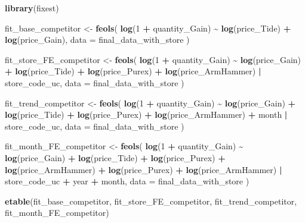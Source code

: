 \documentclass[
]{article}
\newenvironment{Shaded}{\begin{snugshade}}{\end{snugshade}}
\newcommand{\AttributeTok}[1]{\textcolor[rgb]{0.13,0.29,0.53}{#1}}
\newcommand{\DecValTok}[1]{\textcolor[rgb]{0.00,0.00,0.81}{#1}}
\newcommand{\FunctionTok}[1]{\textcolor[rgb]{0.13,0.29,0.53}{\textbf{#1}}}
\newcommand{\NormalTok}[1]{#1}
\newcommand{\OtherTok}[1]{\textcolor[rgb]{0.56,0.35,0.01}{#1}}
\newcommand{\SpecialCharTok}[1]{\textcolor[rgb]{0.81,0.36,0.00}{\textbf{#1}}}
\begin{document}
\begin{Shaded}
\begin{Highlighting}[]
\FunctionTok{library}\NormalTok{(fixest)}

\NormalTok{fit\_base\_competitor }\OtherTok{\textless{}{-}} \FunctionTok{feols}\NormalTok{(}
  \FunctionTok{log}\NormalTok{(}\DecValTok{1} \SpecialCharTok{+}\NormalTok{ quantity\_Gain) }\SpecialCharTok{\textasciitilde{}} \FunctionTok{log}\NormalTok{(price\_Tide) }\SpecialCharTok{+} \FunctionTok{log}\NormalTok{(price\_Gain),}
  \AttributeTok{data =}\NormalTok{ final\_data\_with\_store}
\NormalTok{)}

\NormalTok{fit\_store\_FE\_competitor }\OtherTok{\textless{}{-}} \FunctionTok{feols}\NormalTok{(}
  \FunctionTok{log}\NormalTok{(}\DecValTok{1} \SpecialCharTok{+}\NormalTok{ quantity\_Gain) }\SpecialCharTok{\textasciitilde{}} \FunctionTok{log}\NormalTok{(price\_Gain) }\SpecialCharTok{+} \FunctionTok{log}\NormalTok{(price\_Tide) }\SpecialCharTok{+} \FunctionTok{log}\NormalTok{(price\_Purex) }
  \SpecialCharTok{+} \FunctionTok{log}\NormalTok{(price\_ArmHammer) }\SpecialCharTok{|}\NormalTok{ store\_code\_uc,}
  \AttributeTok{data =}\NormalTok{ final\_data\_with\_store}
\NormalTok{)}

\NormalTok{fit\_trend\_competitor }\OtherTok{\textless{}{-}} \FunctionTok{feols}\NormalTok{(}
  \FunctionTok{log}\NormalTok{(}\DecValTok{1} \SpecialCharTok{+}\NormalTok{ quantity\_Gain) }\SpecialCharTok{\textasciitilde{}} \FunctionTok{log}\NormalTok{(price\_Gain) }\SpecialCharTok{+} \FunctionTok{log}\NormalTok{(price\_Tide) }\SpecialCharTok{+} \FunctionTok{log}\NormalTok{(price\_Purex)}
  \SpecialCharTok{+} \FunctionTok{log}\NormalTok{(price\_ArmHammer) }\SpecialCharTok{+}\NormalTok{ month }\SpecialCharTok{|}\NormalTok{ store\_code\_uc,}
  \AttributeTok{data =}\NormalTok{ final\_data\_with\_store}
\NormalTok{)}

\NormalTok{fit\_month\_FE\_competitor }\OtherTok{\textless{}{-}} \FunctionTok{feols}\NormalTok{(}
  \FunctionTok{log}\NormalTok{(}\DecValTok{1} \SpecialCharTok{+}\NormalTok{ quantity\_Gain) }\SpecialCharTok{\textasciitilde{}} \FunctionTok{log}\NormalTok{(price\_Gain) }\SpecialCharTok{+} \FunctionTok{log}\NormalTok{(price\_Tide) }\SpecialCharTok{+} \FunctionTok{log}\NormalTok{(price\_Purex) }
  \SpecialCharTok{+} \FunctionTok{log}\NormalTok{(price\_ArmHammer) }\SpecialCharTok{+} \FunctionTok{log}\NormalTok{(price\_Purex) }\SpecialCharTok{+} 
    \FunctionTok{log}\NormalTok{(price\_ArmHammer) }\SpecialCharTok{|}\NormalTok{ store\_code\_uc }\SpecialCharTok{+}\NormalTok{ year }\SpecialCharTok{+}\NormalTok{ month,}
  \AttributeTok{data =}\NormalTok{ final\_data\_with\_store}
\NormalTok{)}

\FunctionTok{etable}\NormalTok{(fit\_base\_competitor, fit\_store\_FE\_competitor, fit\_trend\_competitor, }
\NormalTok{       fit\_month\_FE\_competitor)}
\end{Highlighting}
\end{Shaded}
\end{document}
